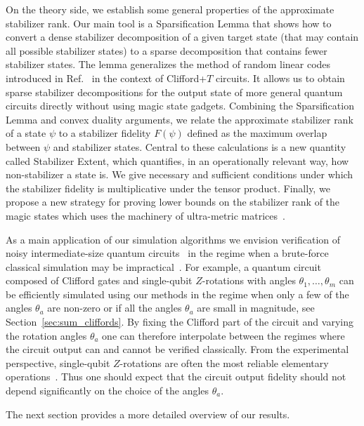 On the theory side, we establish some general  properties of the approximate stabilizer rank.
Our main tool is a Sparsification Lemma that shows how to 
convert a dense stabilizer decomposition of a given target state 
(that may contain all possible stabilizer states) to a sparse decomposition
that contains fewer stabilizer states. 
The lemma generalizes the method of random linear codes introduced  in Ref.~\cite{bravyi2016improved}
in the context of Clifford+$T$ circuits. 
It allows us to obtain sparse stabilizer decompositions for the output state of
more general quantum circuits directly without using magic state gadgets. 
Combining the Sparsification Lemma and  convex duality arguments, we relate
the approximate stabilizer rank of a state $\psi$ to a stabilizer fidelity $F(\psi)$ defined
as the maximum overlap between $\psi$ and stabilizer states. Central to these calculations is a new quantity called Stabilizer Extent, which quantifies, in an operationally relevant way, how non-stabilizer a state is. We give necessary and sufficient conditions under which the stabilizer fidelity is multiplicative under the tensor product. Finally, we propose a new strategy for proving lower bounds on the stabilizer rank
of the magic states which uses the machinery of ultra-metric matrices~\cite{MMM,NabenVarga}.


As a main application of our simulation algorithms we envision verification of noisy intermediate-size
quantum circuits~\cite{preskill2018quantum}
in the regime when a brute-force classical simulation may be
 impractical~\cite{aharonov2017interactive,morimae2016post,Jozsa2017}.
For example, a quantum circuit composed of Clifford gates and single-qubit $Z$-rotations
with angles  $\theta_1,\ldots,\theta_m$ can be efficiently simulated using our methods
in the regime when only a few of the angles $\theta_a$ are non-zero or if all the angles 
$\theta_a$ are small in magnitude, see Section~\ref{sec:sum_cliffords}.
By fixing the Clifford part of the circuit and varying the rotation angles $\theta_a$ one can
therefore interpolate between the regimes where the circuit output  can and cannot be verified 
classically. From the experimental perspective, single-qubit $Z$-rotations
are often the most reliable elementary operations~\cite{mckay2017efficient}.
Thus one should expect that the circuit output fidelity should not depend significantly on the
choice of the angles $\theta_a$.

The next section provides a more detailed overview of our results.
